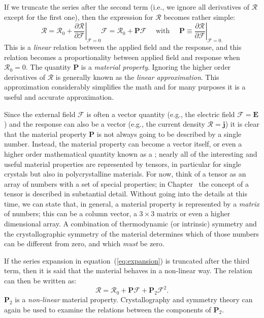 If we truncate the series after the second term (i.e., we ignore all derivatives of $\mathcal{R}$ except for the first one), then the expression for $\mathcal{R}$ becomes rather simple:
\begin{equation}
	\mathcal{R}=\mathcal{R}_0 + 
	\left.\frac{\partial\mathcal{R}}{\partial\mathcal{F}}\right 
	\vert_{\mathcal{F}=0}\!\!\!\!\mathcal{F} =\mathcal{R}_0 + 
	\mathbf{P}\mathcal{F}\quad\mbox{ with }\quad \mathbf{P}\equiv\left.  
	\frac{\partial\mathcal{R}}{\partial\mathcal{F}}\right\vert_{\mathcal{F}=0.
	}
\end{equation}
This is a \textit{linear} relation between the applied field and the response, and this relation becomes a proportionality between applied field and response when $\mathcal{R}_0=0$.  The quantity $\mathbf{P}$ is a \textit{material property}.  Ignoring the higher order derivatives of $\mathcal{R}$ is generally known as the \textit{linear approximation}.  This approximation considerably simplifies the math and for many purposes it is a useful and accurate approximation.

Since the external field $\mathcal{F}$ is often a vector quantity (e.g., the electric field $\mathcal{F}=\mathbf{E}$) and the response can also be a vector (e.g., the current density $\mathcal{R}=\mathbf{j}$) it is clear that the material property $\mathbf{P}$ is not always going to be described by a single number.  Instead, the material property can become a vector itself, or even a higher order mathematical quantity known as a ; nearly all of the interesting and useful material properties are represented by tensors, in particular for single crystals but also in polycrystalline materials.  For now, think of a tensor as an array of numbers with a set of special properties; in Chapter~ the concept of a tensor is described in substantial detail.  Without going into the details at this time, we can state that, in general, a material property is represented by a \textit{matrix} of numbers; this can be a column vector, a $3\times 3$ matrix or even a higher dimensional array.  A combination of thermodynamic (or intrinsic) symmetry and the crystallographic symmetry of the material determines which of those numbers can be different from zero, and which \textit{must} be zero.  

If the series expansion in equation~(\ref{eq:expansion}) is truncated after the third term, then it is said that the material behaves in a non-linear way.  The relation can then be written as:
\begin{equation}
	\mathcal{R}=\mathcal{R}_0 + \mathbf{P}\mathcal{F} + 
	\mathbf{P}_2\mathcal{F}^2.
\end{equation}
$\mathbf{P}_2$ is a \textit{non-linear} material property.  Crystallography and symmetry theory can again be used to examine the relations between the components of $\mathbf{P}_2$.  
	
